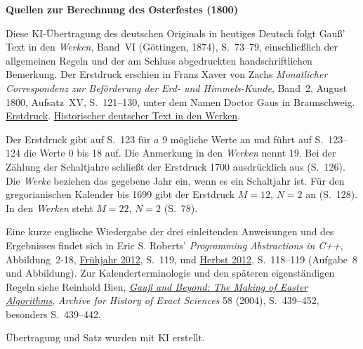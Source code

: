 \clearpage\thispagestyle{empty}
\begin{center}\textbf{Quellen zur Berechnung des Osterfestes (1800)}\end{center}
\noindent Diese KI-Übertragung des deutschen Originals in heutiges Deutsch folgt Gauß’ Text in den \textit{Werken}, Band~VI (Göttingen, 1874), S.~73--79, einschließlich der allgemeinen Regeln und der am Schluss abgedruckten handschriftlichen Bemerkung. Der Erstdruck erschien in Franz Xaver von Zachs \textit{Monatlicher Correspondenz zur Beförderung der Erd- und Himmels-Kunde}, Band~2, August 1800, Aufsatz~XV, S.~121--130, unter dem Namen Doctor Gaus in Braunschweig. \href{https://www.digitale-sammlungen.de/de/view/bsb10538594?page=127}{Erstdruck}. \href{https://gdz.sub.uni-goettingen.de/id/PPN236007467}{Historischer deutscher Text in den Werken}.
\par\smallskip\noindent Der Erstdruck gibt auf S.~123 für $a$ 9 mögliche Werte an und führt auf S.~123--124 die Werte 0 bis 18 auf. Die Anmerkung in den \textit{Werken} nennt 19. Bei der Zählung der Schaltjahre schließt der Erstdruck 1700 ausdrücklich aus (S.~126). Die \textit{Werke} beziehen das gegebene Jahr ein, wenn es ein Schaltjahr ist. Für den gregorianischen Kalender bis 1699 gibt der Erstdruck $M=12$, $N=2$ an (S.~128). In den \textit{Werken} steht $M=22$, $N=2$ (S.~78).
\par\smallskip\noindent Eine kurze englische Wiedergabe der drei einleitenden Anweisungen und des Ergebnisses findet sich in Eric S. Roberts’ \textit{Programming Abstractions in C++}, Abbildung~2-18, \href{https://tfetimes.com/wp-content/uploads/2015/04/Prog-in-Cpp.pdf}{Frühjahr 2012}, S.~119, und \href{https://web.stanford.edu/dept/cs_edu/resources/textbook/Reader-Beta-2012.pdf}{Herbst 2012}, S.~118--119 (Aufgabe~8 und Abbildung). Zur Kalenderterminologie und den späteren eigenständigen Regeln siehe Reinhold Bien, \href{https://doi.org/10.1007/s00407-004-0078-5}{\textit{Gauß and Beyond: The Making of Easter Algorithms}}, \textit{Archive for History of Exact Sciences} 58 (2004), S.~439--452, besonders S.~439--442.
\par\smallskip\noindent Übertragung und Satz wurden mit KI erstellt.
\clearpage
